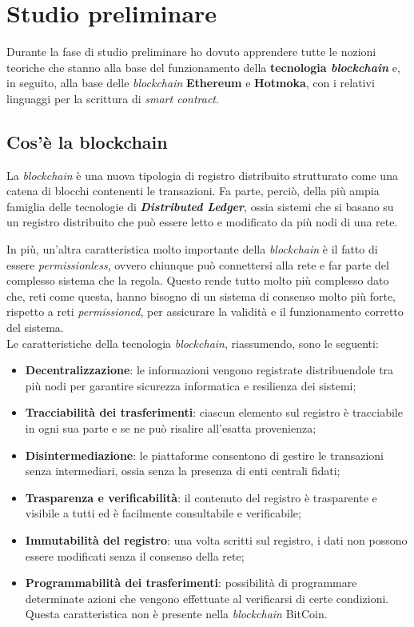 
\section{Studio preliminare}
Durante la fase di studio preliminare ho dovuto apprendere tutte le nozioni teoriche che stanno alla base del funzionamento della \textbf{tecnologia \textit{blockchain}} e, in seguito, alla base delle \textit{blockchain} \textbf{Ethereum} e \textbf{Hotmoka}, con i relativi linguaggi per la scrittura di \textit{smart contract}.

\subsection{Cos'è la blockchain}
La \textit{blockchain} è una nuova tipologia di registro distribuito strutturato come una catena di blocchi contenenti le transazioni. Fa parte, perciò, della più ampia famiglia delle tecnologie di \textbf{\textit{Distributed Ledger}}, ossia sistemi che si basano su un registro distribuito che può essere letto e modificato da più nodi di una rete.

In più, un'altra caratteristica molto importante della \textit{blockchain} è il fatto di essere \textit{permissionless}, ovvero chiunque può connettersi alla rete e far parte del complesso sistema che la regola. Questo rende tutto molto più complesso dato che, reti come questa, hanno bisogno di un sistema di consenso molto più forte, rispetto a reti \textit{permissioned}, per assicurare la validità e il funzionamento corretto del sistema. \\

\noindent Le caratteristiche della tecnologia \textit{blockchain}, riassumendo, sono le seguenti:
\begin{itemize}
  \item \textbf{Decentralizzazione}: le informazioni vengono registrate distribuendole tra più nodi per garantire sicurezza informatica e resilienza dei sistemi;
  \item \textbf{Tracciabilità dei trasferimenti}: ciascun elemento sul registro è tracciabile in ogni sua parte e se ne può risalire all’esatta provenienza;
  \item \textbf{Disintermediazione}: le piattaforme consentono di gestire le transazioni senza intermediari, ossia senza la presenza di enti centrali fidati;
  \item \textbf{Trasparenza e verificabilità}: il contenuto del registro è trasparente e visibile a tutti ed è facilmente consultabile e verificabile;
  \item \textbf{Immutabilità del registro}: una volta scritti sul registro, i dati non possono essere modificati senza il consenso della rete;
  \item \textbf{Programmabilità dei trasferimenti}: possibilità di programmare determinate azioni che vengono effettuate al verificarsi di certe condizioni. Questa caratteristica non è presente nella \textit{blockchain} BitCoin.
\end{itemize}

